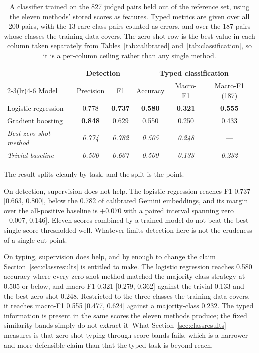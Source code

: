 \begin{table}[htbp]
\centering
\caption[Supervised control]{A classifier trained on the 827 judged pairs held
out of the reference set, using the eleven methods' stored scores as features.
Typed metrics are given over all 200 pairs, with the 13 rare-class pairs counted
as errors, and over the 187 pairs whose classes the training data covers. The
zero-shot row is the best value in each column taken separately from
Tables~\ref{tab:calibrated} and~\ref{tab:classification}, so it is a per-column
ceiling rather than any single method.}
\label{tab:supervised}
\small
\begin{tabular}{lccccc}
\toprule
 & \multicolumn{2}{c}{Detection} & \multicolumn{3}{c}{Typed classification}\\
\cmidrule(lr){2-3}\cmidrule(lr){4-6}
Model & Precision & F1 & Accuracy & Macro-F1 & Macro-F1 (187)\\
\midrule
Logistic regression   & 0.778 & \textbf{0.737} & \textbf{0.580} & \textbf{0.321} & \textbf{0.555}\\
Gradient boosting     & \textbf{0.848} & 0.629 & 0.550 & 0.250 & 0.433\\
\midrule
\emph{Best zero-shot method}    & \emph{0.774} & \emph{0.782} & \emph{0.505} & \emph{0.248} & ---\\
\emph{Trivial baseline}         & \emph{0.500} & \emph{0.667} & \emph{0.500} & \emph{0.133} & \emph{0.232}\\
\bottomrule
\end{tabular}
\end{table}

The result splits cleanly by task, and the split is the point.

On detection, supervision does not help. The logistic regression reaches F1 0.737
[0.663, 0.800], below the 0.782 of calibrated Gemini embeddings, and its margin
over the all-positive baseline is $+0.070$ with a paired interval spanning zero
[$-0.007$, 0.146]. Eleven scores combined by a trained model do not beat the best
single score thresholded well. Whatever limits detection here is not the crudeness
of a single cut point.

On typing, supervision does help, and by enough to change the claim
Section~\ref{sec:classresults} is entitled to make. The logistic regression
reaches 0.580 accuracy where every zero-shot method matched the majority-class
strategy at 0.505 or below, and macro-F1 0.321 [0.279, 0.362] against the trivial
0.133 and the best zero-shot 0.248. Restricted to the three classes the training
data covers, it reaches macro-F1 0.555 [0.477, 0.624] against a majority-class
0.232. The typed information is present in the same scores the eleven methods
produce; the fixed similarity bands simply do not extract it. What
Section~\ref{sec:classresults} measures is that zero-shot typing through score
bands fails, which is a narrower and more defensible claim than that the typed
task is beyond reach.

